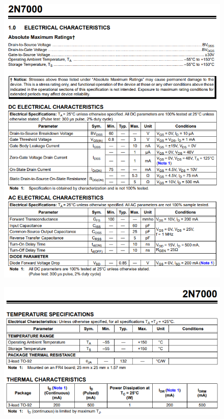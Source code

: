 \begin{figure}[h]
    \centering
    \includegraphics[width=0.9\linewidth]{Appendices/2N7000_1.png}
    \label{2N7000_1}
\end{figure}
\begin{figure}[h]
    \centering
    \includegraphics[width=0.9\linewidth]{Appendices/2N7000_2.png}
    \label{2N7000_2}
\end{figure}
